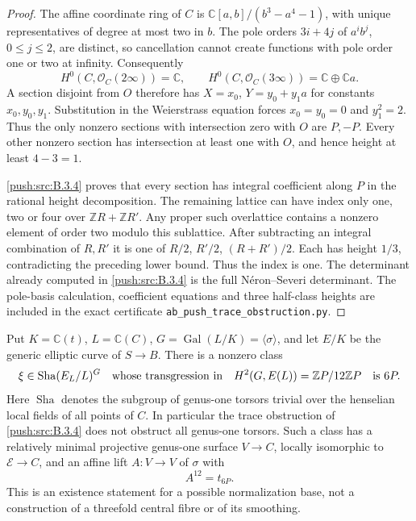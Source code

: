 \begin{proof}
The affine coordinate ring of $C$ is
$\mathbb C[a,b]/(b^3-a^4-1)$, with
unique representatives of degree at most
two in $b$. The pole orders $3i+4j$ of
$a^ib^j$, $0\le j\le2$, are distinct,
so cancellation cannot create functions
with pole order one or two at infinity.
Consequently
\[
 H^0(C,\mathcal O_C(2\infty))=\mathbb C,
 \qquad
 H^0(C,\mathcal O_C(3\infty))
       =\mathbb C\oplus\mathbb Ca.
\]
A section disjoint from $O$ therefore
has $X=x_0$, $Y=y_0+y_1a$ for constants
$x_0,y_0,y_1$. Substitution in the
Weierstrass equation forces $x_0=y_0=0$
and $y_1^2=2$. Thus the only nonzero
sections with intersection zero with
$O$ are $P,-P$.
Every other nonzero section has
intersection at least one with $O$,
and hence height at least $4-3=1$.

\ref{push:src:B.3.4} proves that every section has
integral coefficient along $P$ in the
rational height decomposition. The
remaining lattice can have index only
one, two or four over $\mathbb ZR+\mathbb ZR'$.
Any proper such overlattice contains a
nonzero element of order two modulo
this sublattice. After subtracting an
integral combination of $R,R'$ it is
one of $R/2$, $R'/2$, $(R+R')/2$.
Each has height $1/3$, contradicting
the preceding lower bound. Thus the
index is one. The determinant already
computed in \ref{push:src:B.3.4} is the full
N\'eron--Severi determinant.
The pole-basis calculation, coefficient
equations and three half-class heights
are included in the exact certificate
\texttt{ab\_push\_trace\_obstruction.py}.
\end{proof}

\begin{proposition}\label{push:src:B.3.6}\label{push:B36}
Put $K=\mathbb C(t)$, $L=\mathbb C(C)$,
$G=\operatorname{Gal}(L/K)=\langle\sigma\rangle$,
and let $E/K$ be the generic elliptic
curve of $S\to B$. There is a nonzero
class
\[
 \xi\in\operatorname{Sha}(E_L/L)^G
 \quad\hbox{whose transgression in}\quad
 H^2(G,E(L))=\mathbb ZP/12\mathbb ZP
 \quad\hbox{is }6P.
\]
Here $\operatorname{Sha}$ denotes the
subgroup of genus-one torsors trivial
over the henselian local fields of all
points of $C$.
In particular the trace obstruction of
\ref{push:src:B.3.4} does not obstruct all genus-one
torsors. Such a class has a relatively
minimal projective genus-one surface
$V\to C$, locally isomorphic to
$\mathscr E\to C$, and an affine lift
$A:V\to V$ of $\sigma$ with
\[
 A^{12}=t_{6P}.
\]
This is an existence statement for a
possible normalization base, not a
construction of a threefold central
fibre or of its smoothing.
\end{proposition}

